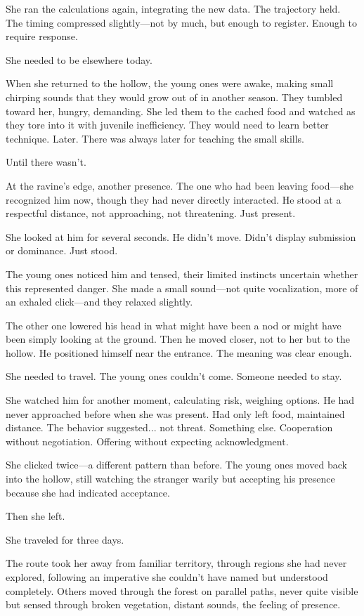 She ran the calculations again, integrating the new data. The trajectory held. The timing compressed slightly—not by much, but enough to register. Enough to require response.

She needed to be elsewhere today.

When she returned to the hollow, the young ones were awake, making small chirping sounds that they would grow out of in another season. They tumbled toward her, hungry, demanding. She led them to the cached food and watched as they tore into it with juvenile inefficiency. They would need to learn better technique. Later. There was always later for teaching the small skills.

Until there wasn't.

At the ravine's edge, another presence. The one who had been leaving food—she recognized him now, though they had never directly interacted. He stood at a respectful distance, not approaching, not threatening. Just present.

She looked at him for several seconds. He didn't move. Didn't display submission or dominance. Just stood.

The young ones noticed him and tensed, their limited instincts uncertain whether this represented danger. She made a small sound—not quite vocalization, more of an exhaled click—and they relaxed slightly.

The other one lowered his head in what might have been a nod or might have been simply looking at the ground. Then he moved closer, not to her but to the hollow. He positioned himself near the entrance. The meaning was clear enough.

She needed to travel. The young ones couldn't come. Someone needed to stay.

She watched him for another moment, calculating risk, weighing options. He had never approached before when she was present. Had only left food, maintained distance. The behavior suggested... not threat. Something else. Cooperation without negotiation. Offering without expecting acknowledgment.

She clicked twice—a different pattern than before. The young ones moved back into the hollow, still watching the stranger warily but accepting his presence because she had indicated acceptance.

Then she left.

\scenebreak

She traveled for three days.

The route took her away from familiar territory, through regions she had never explored, following an imperative she couldn't have named but understood completely. Others moved through the forest on parallel paths, never quite visible but sensed through broken vegetation, distant sounds, the feeling of presence.

